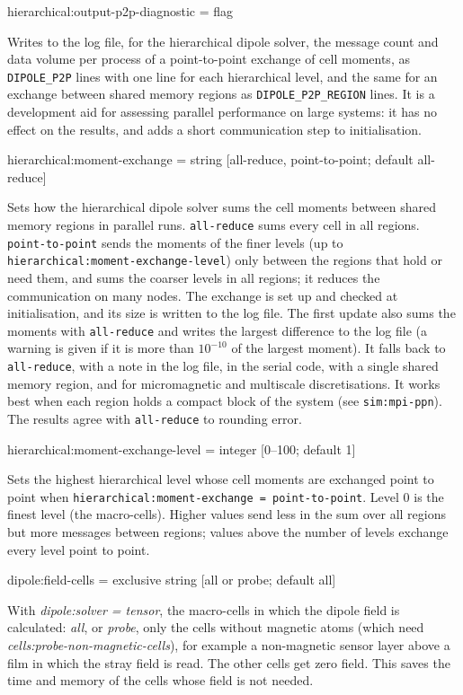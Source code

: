 {\zicf hierarchical:output-p2p-diagnostic = flag} Writes to the log file, for the hierarchical dipole solver, the message count and data volume per process of a point-to-point exchange of cell moments, as \texttt{DIPOLE\_P2P} lines with one line for each hierarchical level, and the same for an exchange between shared memory regions as \texttt{DIPOLE\_P2P\_REGION} lines. It is a development aid for assessing parallel performance on large systems: it has no effect on the results, and adds a short communication step to initialisation.

{\zicf hierarchical:moment-exchange = string [all-reduce, point-to-point; default all-reduce]} Sets how the hierarchical dipole solver sums the cell moments between shared memory regions in parallel runs. \texttt{all-reduce} sums every cell in all regions. \texttt{point-to-point} sends the moments of the finer levels (up to \texttt{hierarchical:moment-exchange-level}) only between the regions that hold or need them, and sums the coarser levels in all regions; it reduces the communication on many nodes. The exchange is set up and checked at initialisation, and its size is written to the log file. The first update also sums the moments with \texttt{all-reduce} and writes the largest difference to the log file (a warning is given if it is more than $10^{-10}$ of the largest moment). It falls back to \texttt{all-reduce}, with a note in the log file, in the serial code, with a single shared memory region, and for micromagnetic and multiscale discretisations. It works best when each region holds a compact block of the system (see \texttt{sim:mpi-ppn}). The results agree with \texttt{all-reduce} to rounding error.

{\zicf hierarchical:moment-exchange-level = integer [0--100; default 1]} Sets the highest hierarchical level whose cell moments are exchanged point to point when \texttt{hierarchical:moment-exchange = point-to-point}. Level 0 is the finest level (the macro-cells). Higher values send less in the sum over all regions but more messages between regions; values above the number of levels exchange every level point to point.

{\zicf dipole:field-cells = exclusive string [all or probe; default all]} With \textit{dipole:solver = tensor}, the macro-cells in which the dipole field is calculated: \textit{all}, or \textit{probe}, only the cells without magnetic atoms (which need \textit{cells:probe-non-magnetic-cells}), for example a non-magnetic sensor layer above a film in which the stray field is read. The other cells get zero field. This saves the time and memory of the cells whose field is not needed.

